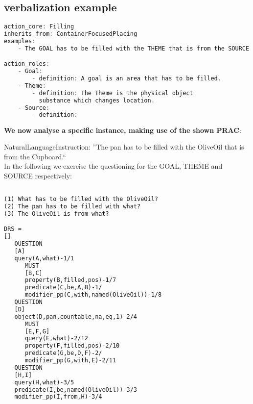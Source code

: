 \documentclass[10pt,a4paper]{article}
\begin{document}
\newpage
\appendix
\subsection{verbalization example}
{\small
\begin{lstlisting}[language=c,label=firstlook,caption=serialized PRAC of the verb 'Filling']
action_core: Filling
inherits_from: ContainerFocusedPlacing
examples:
    - The GOAL has to be filled with the THEME that is from the SOURCE.

action_roles:
    - Goal:
        - definition: A goal is an area that has to be filled.
    - Theme:
        - definition: The Theme is the physical object 
          substance which changes location. 
    - Source:
        - definition: 
\end{lstlisting}
\textbf{We now analyse a specific instance, making use of the shown PRAC}:\\

\parbox[c]{800px}{
NaturalLanguageInstruction: ''The pan has to be filled with the OliveOil that is from the Cupboard.``\\
In the following we exercise the questioning for the GOAL, THEME and SOURCE respectively:	
}

\begin{lstlisting}[language=HTML,label=firstlook,caption=ACE questions and resulting DRS]

(1) What has to be filled with the OliveOil?
(2) The pan has to be filled with what?
(3) The OliveOil is from what? 

DRS = 
[]
   QUESTION
   [A]
   query(A,what)-1/1
      MUST
      [B,C]
      property(B,filled,pos)-1/7
      predicate(C,be,A,B)-1/
      modifier_pp(C,with,named(OliveOil))-1/8
   QUESTION
   [D]
   object(D,pan,countable,na,eq,1)-2/4
      MUST
      [E,F,G]
      query(E,what)-2/12
      property(F,filled,pos)-2/10
      predicate(G,be,D,F)-2/
      modifier_pp(G,with,E)-2/11
   QUESTION
   [H,I]
   query(H,what)-3/5
   predicate(I,be,named(OliveOil))-3/3
   modifier_pp(I,from,H)-3/4

\end{lstlisting}
}


\newpage




\end{document}
